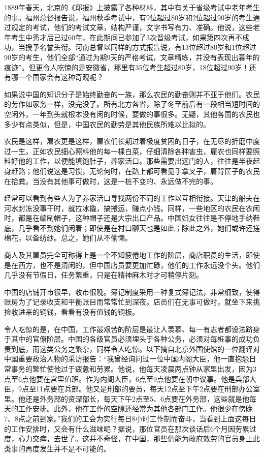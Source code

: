 \documentclass[12pt,oneside]{book}
\begin{document}
\begin{common-format}
1889年春天，北京的《邸报》上披露了各种材料，其中有关于省级考试中老年考生的事。福州总督报告说，福州秋季考试中，有9位超过80岁和2位超过90岁的考生通过规定的考试，他们的考试文章，结构严谨，文字书写有力、准确。他说，这些老年考生中秀才后已过60年，在此期间已参加了3次晋级考试，如果第四次再不成功，当授予名誉头衔。河南总督以同样的方式报告说，有13位超过80岁和1位超过90岁的考生，他们全部“通过为期9天的严格考试，文章精练，并没有表现出暮年的痕迹”。但更令人吃惊的是安徽省，那里有35位考生超过80岁，18位超过90岁！还有哪一个国家会有这种奇观呢？ 

如果说中国的知识分子是始终勤奋的一族，那么农民的勤奋则并不亚于他们。农民的劳作如家务一样，没完没了。所有北方各省，除了冬至前后有一段相当短时间的空闲外，一年到头就根本没有闲的时候，要做的事很多。无疑，其他各国的农民也多少有点类似，但是，中国农民的勤劳是其他民族所难以比拟的。 

农民是这样，雇农更是这样，雇农们长期过着极度贫困的日子，在无尽的折磨中度过一生。正如农民细心照料他的每一棵白菜，仔细清除各种害虫，雇农也同样要照料好他的工作，以便能填饱肚子，养家活口。那些需要出远门的人，往往是半夜起身赶路；他们说这是习惯，无论何时，在路上都可看见手拿叉子，肩背筐子的农民在拾粪。当没有其他事可做时，这是一桩不变的、永远做不完的事。 

经常可以看到有些人为了养家活口寻找两份不同的工作以互相衔接。天津的船夫在河水封冻没事干时，就拉冰撬，搞搬运，赚点小钱。同样，一些地区的农民在农闲时，都是在编制帽子，这种帽子还是大宗出口产品。中国妇女往往是不停地手纳鞋底，几乎看不到她们闲着；即使是在村口聊天也是如此；除此之外，她们或许还搓棉花，以备纺纱。总之，她们从不偷懒。

商人及其雇员完全可称得上是一个不知疲倦地工作的阶层，商店职员的生活，即使是在西方，也不是清闲的，但中国店员要更加忙碌，他们的工作永远没个头。他们几乎没有节假日，任务繁重，只是在精神麻木时才可稍停片刻。 

中国的店铺开市很早，收市很晚。簿记制度采用一种复式簿记法，非常细致，使得账房为了记录收支和平衡账目而常常忙到深夜。店员们在无事可做时，就坐下来挑捡收进来的铜钱，看看有没有值钱的铜板。 

令人吃惊的是，在中国，工作最艰苦的阶层是最让人羡慕、每一有志者都设法跻身于其中的官僚阶层。中国的各级官员必须埋头于各种公务，必须对每桩事的成功负责到底，而这类公务之繁杂，同样令人吃惊。以下摘自北京外国使馆的一位翻译对中国重要政治人物的采访报告：“我曾经询问过一位中国内阁大臣，他一直抱怨日常事务的繁忙使他过于疲惫和劳累。他说，他每天凌晨两点钟从家里出发，因为3点至6点他要在宫里值班。作为内阁大臣，6点至9点他要在朝中议事。他是兵部大臣，9点至11点要在兵部。他又是刑部的要员，每天12点至下午2点要在刑部办公室里。他还是外务部的资深部长，每天下午2点至5、6点要在外务部，这些就是他每天的工作安排。此外，他在工作的空隙还经常为其他各部门工作。他很少在傍晚7、8点之前到家。”我们的工会为实行每日8小时工作制而奋斗，当看到上面这每日的工作安排时，又会有什么滋味呢？据说，那位官员在那次谈话后6个月因劳累过度，心力交瘁，去世了。这并不奇怪，在中国，那些仍能为政府效劳的官员身上此类事的再度发生并不是不可能的。


\end{common-format}
\end{document}

